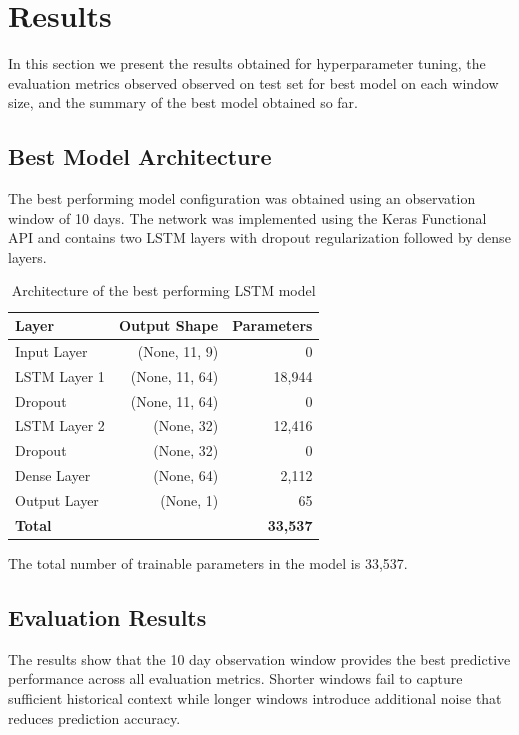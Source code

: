\documentclass[11pt]{article}
\begin{document}
\section{Results}
In this section we present the results obtained for hyperparameter tuning, the evaluation metrics observed observed on test set for best model on each window size, and the summary of the best model obtained so far.

\subsection{Best Model Architecture}

The best performing model configuration was obtained using an observation window of 10 days. The network was implemented using the Keras Functional API and contains two LSTM layers with dropout regularization followed by dense layers.

\begin{table}[h]
\centering
\small
\begin{tabular}{l r r}
\hline
\textbf{Layer} & \textbf{Output Shape} & \textbf{Parameters} \\
\hline
Input Layer & (None, 11, 9) & 0 \\
LSTM Layer 1 & (None, 11, 64) & 18,944 \\
Dropout & (None, 11, 64) & 0 \\
LSTM Layer 2 & (None, 32) & 12,416 \\
Dropout & (None, 32) & 0 \\
Dense Layer & (None, 64) & 2,112 \\
Output Layer & (None, 1) & 65 \\
\hline
\textbf{Total} & & \textbf{33,537} \\
\hline
\end{tabular}
\caption{Architecture of the best performing LSTM model}
\end{table}

The total number of trainable parameters in the model is 33,537.


\subsection{Evaluation Results}
The results show that the 10 day observation window provides the best predictive performance across all evaluation metrics. Shorter windows fail to capture sufficient historical context while longer windows introduce additional noise that reduces prediction accuracy.
\end{document}
